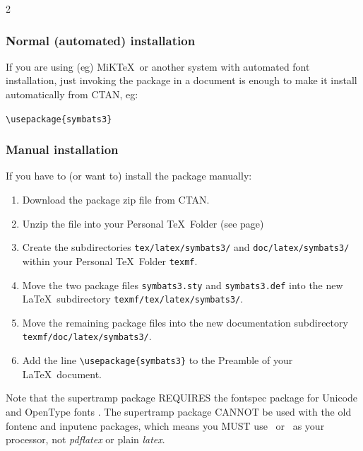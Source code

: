 \documentclass{article}
\begin{document}
\begin{multicols*}{2}
\subsubsection{Normal (automated) installation}

If you are using (eg) MiK\TeX\ or another system with automated font
installation, just invoking the package in a document is enough to
make it install automatically from CTAN, eg:

\verb+\usepackage{symbats3}+

\subsubsection{Manual installation}

If you have to (or want to) install the package manually:

\begin{enumerate}
  
\item Download the package zip file from CTAN.

\item Unzip the file into your Personal \TeX\ Folder (see
  page\thinspace\pageref{ptf}) 

\item Create the subdirectories \verb+tex/latex/symbats3/+ and
  \verb+doc/latex/symbats3/+ within
    your Personal \TeX\ Folder \verb+texmf+.
    
\item Move the two package files \verb+symbats3.sty+ and
  \verb+symbats3.def+ into the new \LaTeX\ subdirectory
  \verb+texmf/tex/latex/symbats3/+.

\item Move the remaining package files into the new documentation
    subdirectory \verb+texmf/doc/latex/symbats3/+.

\item Add the line \verb+\usepackage{symbats3}+ to the Preamble of
  your \LaTeX\ document.

  \end{enumerate}

Note that the \textsf{supertramp} package \textsf{\smaller REQUIRES}
the \textsf{fontspec} package for Unicode and OpenType fonts
\parencite{fontspec}. The \textsf{supertramp} package \textsf{\smaller
  CANNOT} be used with the old \textsf{fontenc} and \textsf{inputenc}
packages, which means you \textsf{\smaller MUST} use \XeLaTeX\ or
  \LuaLaTeX\ as your processor, not \textit{pdflatex} or plain
  \textit{latex}.


\end{multicols*}
\end{document}
